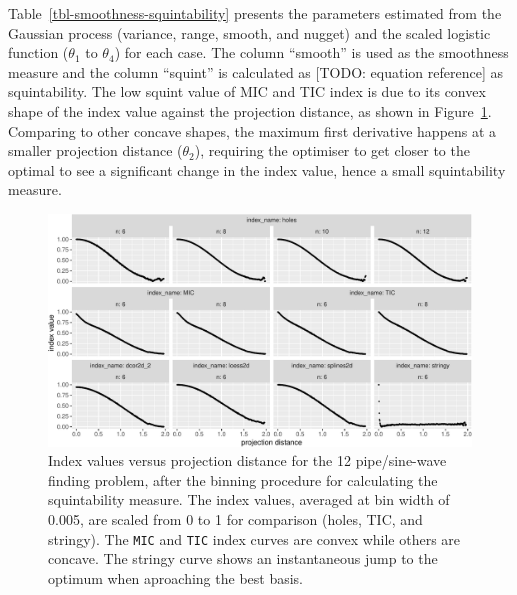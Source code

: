 \documentclass[
  number,
  preprint,
  3p]{elsarticle}
\begin{document}
Table~\ref{tbl-smoothness-squintability} presents the parameters
estimated from the Gaussian process (variance, range, smooth, and
nugget) and the scaled logistic function (\(\theta_1\) to \(\theta_4\))
for each case. The column ``smooth'' is used as the smoothness measure
and the column ``squint'' is calculated as {[}TODO: equation
reference{]} as squintability. The low squint value of MIC and TIC index
is due to its convex shape of the index value against the projection
distance, as shown in Figure~\ref{fig-idx-proj-dist}. Comparing to other
concave shapes, the maximum first derivative happens at a smaller
projection distance (\(\theta_2\)), requiring the optimiser to get
closer to the optimal to see a significant change in the index value,
hence a small squintability measure.

\begin{figure}

{\centering \includegraphics{optim_files/figure-pdf/fig-idx-proj-dist-1.pdf}

}

\caption{\label{fig-idx-proj-dist}Index values versus projection
distance for the 12 pipe/sine-wave finding problem, after the binning
procedure for calculating the squintability measure. The index values,
averaged at bin width of 0.005, are scaled from 0 to 1 for comparison
(holes, TIC, and stringy). The \texttt{MIC} and \texttt{TIC} index
curves are convex while others are concave. The stringy curve shows an
instantaneous jump to the optimum when aproaching the best basis.}

\end{figure}
\end{document}
